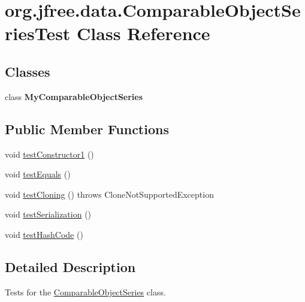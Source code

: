 \hypertarget{classorg_1_1jfree_1_1data_1_1_comparable_object_series_test}{}\section{org.\+jfree.\+data.\+Comparable\+Object\+Series\+Test Class Reference}
\label{classorg_1_1jfree_1_1data_1_1_comparable_object_series_test}
\subsection*{Classes}
\begin{DoxyCompactItemize}
\item 
class {\bfseries My\+Comparable\+Object\+Series}
\end{DoxyCompactItemize}
\subsection*{Public Member Functions}
\begin{DoxyCompactItemize}
\item 
void \mbox{\hyperlink{classorg_1_1jfree_1_1data_1_1_comparable_object_series_test_a7a698720c9bd13e84dee132103d6471d}{test\+Constructor1}} ()
\item 
void \mbox{\hyperlink{classorg_1_1jfree_1_1data_1_1_comparable_object_series_test_a618097290e81b2b23b312fb71900f8a0}{test\+Equals}} ()
\item 
void \mbox{\hyperlink{classorg_1_1jfree_1_1data_1_1_comparable_object_series_test_a1b8efc35f4c1391fd279cef7b9a2ac5f}{test\+Cloning}} ()  throws Clone\+Not\+Supported\+Exception 
\item 
void \mbox{\hyperlink{classorg_1_1jfree_1_1data_1_1_comparable_object_series_test_a7f8bdaf9759c8dc4e9cd1e46995fe224}{test\+Serialization}} ()
\item 
void \mbox{\hyperlink{classorg_1_1jfree_1_1data_1_1_comparable_object_series_test_a94c8ef8ac1cd96aa87b0a19f87798db1}{test\+Hash\+Code}} ()
\end{DoxyCompactItemize}


\subsection{Detailed Description}
Tests for the \mbox{\hyperlink{classorg_1_1jfree_1_1data_1_1_comparable_object_series}{Comparable\+Object\+Series}} class. 

